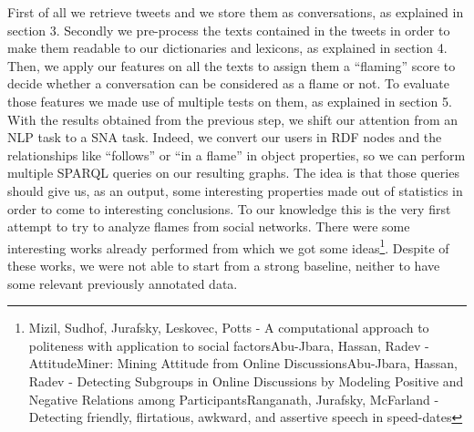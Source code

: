 \documentclass[a4paper,10pt, english]{report}
\begin{document}
First of all we retrieve tweets and we store them as conversations, as explained in section 3.
Secondly we pre-process the texts contained in the tweets in order to make them readable to our dictionaries and lexicons, as explained in section 4.
Then, we apply our features on all the texts to assign them a ``flaming'' score to decide whether a conversation can be considered as a flame or not.
To evaluate those features we made use of multiple tests on them, as explained in section 5.
\newline
With the results obtained from the previous step, we shift our attention from an NLP task to a SNA task.
Indeed, we convert our users in RDF nodes and the relationships like ``follows'' or ``in a flame'' in object properties, so we can perform multiple SPARQL queries on our resulting graphs.
The idea is that those queries should give us, as an output, some interesting properties made out of statistics in order to come to interesting conclusions.
\newline\newline
To our knowledge this is the very first attempt to try to analyze flames from social networks.
There were some interesting works already performed from which we got some ideas\footnote{Mizil, Sudhof, Jurafsky, Leskovec, Potts - A computational approach to politeness with application to social factors\newline Abu-Jbara, Hassan, Radev - AttitudeMiner: Mining Attitude from Online Discussions\newline Abu-Jbara, Hassan, Radev - Detecting Subgroups in Online Discussions by Modeling Positive and Negative Relations among Participants\newline Ranganath, Jurafsky, McFarland - Detecting friendly, flirtatious, awkward, and assertive speech in speed-dates}.
Despite of these works, we were not able to start from a strong baseline, neither to have some relevant previously annotated data.
\end{document}
